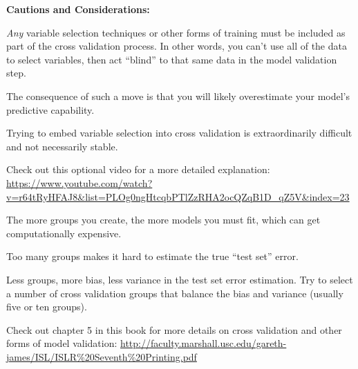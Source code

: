 \documentclass[12pt]{../notes}
\begin{document}
\nspace
\textbf{Cautions and Considerations:}
\bi
\item \textit{Any} variable selection techniques or other forms of training must be included as part of the cross validation process. In other words, you can't use all of the data to select variables, then act ``blind'' to that same data in the model validation step. 
\bi
\item The consequence of such a move is that you will likely overestimate your model's predictive capability. 
\item Trying to embed variable selection into cross validation is extraordinarily difficult and not necessarily stable. 
\item Check out this optional video for a more detailed explanation: \url{https://www.youtube.com/watch?v=r64tRyHFAJ8&list=PLOg0ngHtcqbPTlZzRHA2ocQZqB1D_qZ5V&index=23}
\ei
\item The more groups you create, the more models you must fit, which can get computationally expensive. 
\item Too many groups makes it hard to estimate the true ``test set'' error. 
\bi
\item Less groups, more bias, less variance in the test set error estimation. Try to select a number of cross validation groups that balance the bias and variance (usually five or ten groups). 
\ei
\item Check out chapter 5 in this book for more details on cross validation and other forms of model validation: 
\url{http://faculty.marshall.usc.edu/gareth-james/ISL/ISLR\%20Seventh\%20Printing.pdf}
\ei


\end{document}
